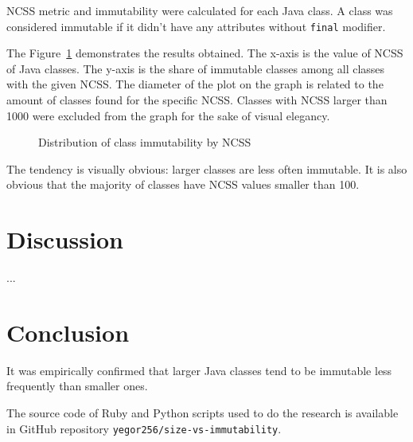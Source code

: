 \documentclass[12pt]{article}
\begin{document}
NCSS metric and immutability were calculated for each Java class.
A class was considered immutable if it didn't have any
attributes without \texttt{final} modifier.

The Figure~\ref{fig:1} demonstrates the results obtained. The x-axis is
the value of NCSS of Java classes. The y-axis is the share of immutable classes among
all classes with the given NCSS. The diameter of the plot on the graph
is related to the amount of classes found for the specific NCSS. Classes
with NCSS larger than 1000 were excluded from the graph for the sake of
visual elegancy.

\begin{figure}[h]
  
  \caption{Distribution of class immutability by NCSS}
  \label{fig:1}
\end{figure}

The tendency is visually obvious: larger classes are less often immutable. It
is also obvious that the majority of classes have NCSS values smaller than 100.

\section{Discussion}

...

\section{Conclusion}

It was empirically confirmed that larger Java classes tend to be immutable
less frequently than smaller ones.

The source code of Ruby and Python scripts used to do the research
is available in GitHub repository \texttt{yegor256/size-vs-immutability}.


\end{document}
